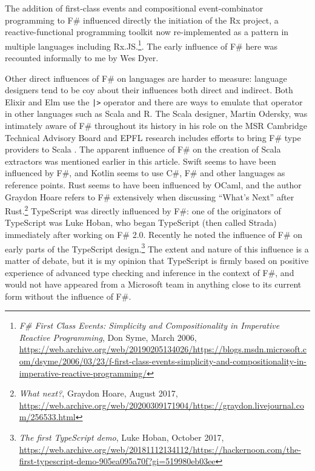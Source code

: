 \documentclass[acmsmall]{acmart}\settopmatter{}
\begin{document}
The addition of first-class events and compositional event-combinator programming to F\# influenced directly the initiation
of the Rx project, a reactive-functional programming toolkit now re-implemented as a pattern in multiple languages
including Rx.JS.\footnote{\textit{F\# First Class Events: Simplicity and Compositionality in Imperative Reactive Programming}, Don Syme, March 2006, \url{https://web.archive.org/web/20190205134026/https://blogs.msdn.microsoft.com/dsyme/2006/03/23/f-first-class-events-simplicity-and-compositionality-in-imperative-reactive-programming/}}.   The early influence of F\# here was recounted informally to me by Wes Dyer. 

Other direct influences of F\# on languages are harder to measure: language designers tend to be coy about their
influences both direct and indirect. Both Elixir and Elm use the \texttt{|>} operator and there are ways to emulate that operator
in other languages such as Scala and R. The Scala designer, Martin Odersky, was intimately aware of F\# throughout
its history in his role on the MSR Cambridge Technical Advisory Board and EPFL research includes efforts to
bring F\# type providers to Scala \citep{Burmako2013}.  The apparent influence of F\# on the
creation of Scala extractors was mentioned earlier in this article. Swift seems to have been influenced
by F\#, and Kotlin seems to use C\#, F\# and other languages as reference points.  Rust seems to have been
influenced by OCaml, and the author Graydon Hoare refers to F\# extensively when discussing “What’s Next” after
Rust.\footnote{\textit{What next?}, Graydon Hoare, August 2017, \url{https://web.archive.org/web/20200309171904/https://graydon.livejournal.com/256533.html}}
TypeScript was directly influenced by F\#: one of the originators of TypeScript was
Luke Hoban, who began TypeScript (then called Strada) immediately after working on F\# 2.0. Recently
he noted the influence of F\# on early parts of the TypeScript
design.\footnote{\textit{The first TypeScript demo}, Luke Hoban, October 2017, \url{https://web.archive.org/web/20181112134112/https://hackernoon.com/the-first-typescript-demo-905ea095a70f?gi=519980eb03ee}} The
extent and nature of this influence is a matter of debate, but it is my opinion that TypeScript is firmly based on positive experience of advanced type checking and inference
in the context of F\#, and would not have appeared from a Microsoft team in anything close to its current form without the influence of F\#.
\end{document}
